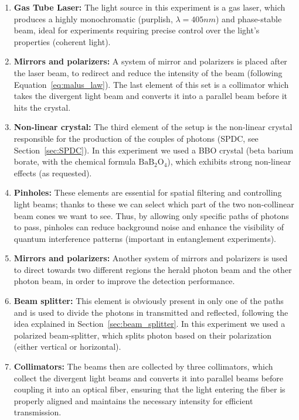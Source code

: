 \documentclass[prl,twocolumn]{revtex4-1}
\begin{document}
\begin{enumerate}
    \item \textbf{Gas Tube Laser:} The light source in this experiment is a gas laser, which produces a highly monochromatic (purplish, $\lambda = 405 nm$) and phase-stable beam, ideal for experiments requiring precise control over the light’s properties (coherent light).
    \item \textbf{Mirrors and polarizers:} A system of mirror and polarizers is placed after the laser beam, to redirect and reduce the intensity of the beam (following Equation~\eqref{eq:malus_law}). The last element of this set is a collimator which takes the divergent light beam and converts it into a parallel beam before it hits the crystal.
    \item \textbf{Non-linear crystal:} The third element of the setup is the non-linear crystal responsible for the production of the couples of photons (SPDC, see Section~\ref{sec:SPDC}). In this experiment we used a BBO crystal (beta barium borate, with the chemical formula $\text{BaB}_2\text{O}_4$), which exhibits strong non-linear effects (as requested).
    \item \textbf{Pinholes:} These elements are essential for spatial filtering and controlling light beams; thanks to these we can select which part of the two non-collinear beam cones we want to see. Thus, by allowing only specific paths of photons to pass, pinholes can reduce background noise and enhance the visibility of quantum interference patterns (important in entanglement experiments). 
    \item \textbf{Mirrors and polarizers:} Another system of mirrors and polarizers is used to direct towards two different regions the herald photon beam and the other photon beam, in order to improve the detection performance.
    \item \textbf{Beam splitter:} This element is obviously present in only one of the paths and is used to divide the photons in transmitted and reflected, following the idea explained in Section~\ref{sec:beam_splitter}. In this experiment we used a polarized beam-splitter, which splits photon based on their polarization (either vertical or horizontal).
    \item \textbf{Collimators:} The beams then are collected by three collimators, which collect the divergent light beams and converts it into parallel beams before coupling it into an optical fiber, ensuring that the light entering the fiber is properly aligned and maintains the necessary intensity for efficient transmission.

\end{enumerate}
\end{document}
